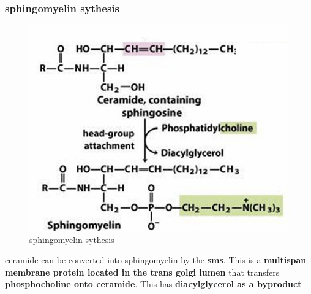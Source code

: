 \documentclass[../main.tex]{subfiles}
\begin{document}
\subsubsection{sphingomyelin sythesis}
\begin{figure}[H]
    \centering
    \includegraphics[width=0.5\linewidth]{sphingomyelinSythesis.png}
    \caption{sphingomyelin sythesis}
    \label{fig:enter-label}
\end{figure}
ceramide can be converted into sphingomyelin by the \textbf{\gls{sms}}. This is a\textbf{ multispan membrane protein located in the trans golgi lumen} that transfers \textbf{phosphocholine onto ceramide}. This has \textbf{diacylglycerol as a byproduct}
\end{document}

